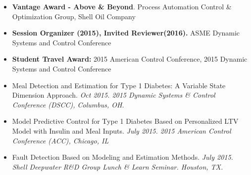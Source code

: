 \documentclass[10pt,a4paper]{article}
\begin{document}
  
  \spacedhrule{0.5em}{-0.5em}
  \begin{itemize}
  \item \textbf{Vantage Award - Above \& Beyond}. Process
    Automation Control \& Optimization Group, Shell Oil Company
  \item \textbf{Session Organizer (2015), Invited Reviewer(2016).} ASME Dynamic Systems
    and Control Conference
  \item \textbf{Student Travel Award:} 2015 American Control Conference, 2015 Dynamic Systems and Control Conference
  \end{itemize}


  

  \spacedhrule{1em}{-0.8em}
  \begin{itemize}
  \item Meal Detection and Estimation for Type 1 Diabetes: A
      Variable State Dimension Approach. \textit{Oct 2015. 2015 Dynamic Systems \& Control
      Conference (DSCC), Columbus, OH.}

  \item Model Predictive Control for Type 1 Diabetes Based on Personalized LTV
    Model with Insulin and Meal Inputs. \textit{July 2015. 2015 American Control
      Conference (ACC), Chicago, IL}
    
  \item Fault Detection Based on Modeling and Estimation Methods. \textit{July 2015.
    Shell Deepwater R\&D Group Lunch \& Learn Seminar. Houston, TX.}
  \end{itemize}
\end{document}
